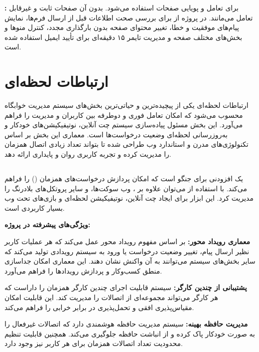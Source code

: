 \documentclass[12pt,a4paper]{report}
\begin{document}
	\textbf{:} برای تعامل و پویایی صفحات استفاده می‌شود. بدون آن صفحات ثابت و غیرقابل تعامل می‌مانند. در پروژه از  برای بررسی صحت اطلاعات قبل از ارسال فرم‌ها، نمایش پیام‌های موفقیت و خطا، تغییر محتوای صفحه بدون بارگذاری مجدد، کنترل منوها و بخش‌های مختلف صفحه و مدیریت تایمر ۱۵ دقیقه‌ای برای تأیید ایمیل استفاده شده است.
	
	\section{ارتباطات لحظه‌ای}
	
	ارتباطات لحظه‌ای یکی از پیچیده‌ترین و حیاتی‌ترین بخش‌های سیستم مدیریت خوابگاه محسوب می‌شود که امکان تعامل فوری و دوطرفه بین کاربران و مدیریت را فراهم می‌آورد. این بخش مسئول پیاده‌سازی سیستم چت آنلاین، نوتیفیکیشن‌های خودکار و به‌روزرسانی لحظه‌ای وضعیت درخواست‌ها است. معماری این بخش بر اساس تکنولوژی‌های مدرن و استاندارد وب طراحی شده تا بتواند تعداد زیادی اتصال همزمان را مدیریت کرده و تجربه کاربری روان و پایداری ارائه دهد.
	
	\subsection{}
	
	 یک افزودنی برای جنگو است که امکان پردازش درخواست‌های همزمان () را فراهم می‌کند. با استفاده از  می‌توان علاوه بر ، وب سوکت‌ها،  و سایر پروتکل‌های بلادرنگ را مدیریت کرد. این ابزار برای ایجاد چت آنلاین، نوتیفیکیشن لحظه‌ای و بازی‌های تحت وب بسیار کاربردی است.
	
	\textbf{ویژگی‌های پیشرفته  در پروژه:}
	
	\textbf{معماری رویداد محور:} بر اساس مفهوم رویداد محور عمل می‌کند که هر عملیات کاربر نظیر ارسال پیام، تغییر وضعیت درخواست یا ورود به سیستم رویدادی تولید می‌کند که سایر بخش‌های سیستم می‌توانند به آن واکنش نشان دهند. این معماری امکان جداسازی منطق کسب‌وکار و پردازش رویدادها را فراهم می‌آورد.
	
	\textbf{پشتیبانی از چندین کارگر:} سیستم قابلیت اجرای چندین کارگر همزمان را داراست که هر کارگر می‌تواند مجموعه‌ای از اتصالات  را مدیریت کند. این قابلیت امکان مقیاس‌پذیری افقی و تحمل‌پذیری در برابر خرابی را فراهم می‌کند.
	
	\textbf{مدیریت حافظه بهینه:}  سیستم مدیریت حافظه هوشمندی دارد که اتصالات غیرفعال را به صورت خودکار پاک کرده و از انباشت حافظه جلوگیری می‌کند. همچنین قابلیت تنظیم محدودیت تعداد اتصالات همزمان برای هر کاربر نیز وجود دارد.
	
\end{document}
